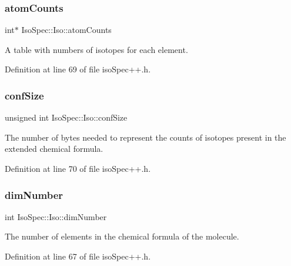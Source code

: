\subsubsection{\texorpdfstring{atom\+Counts}{atomCounts}}
{\footnotesize\ttfamily int$\ast$ Iso\+Spec\+::\+Iso\+::atom\+Counts\hspace{0.3cm}{\ttfamily [protected]}}

A table with numbers of isotopes for each element. 

Definition at line 69 of file iso\+Spec++.\+h.

\mbox{\label{class_iso_spec_1_1_iso_a89ed144bf2495fa25840aca90a31b425}} 
\subsubsection{\texorpdfstring{conf\+Size}{confSize}}
{\footnotesize\ttfamily unsigned int Iso\+Spec\+::\+Iso\+::conf\+Size\hspace{0.3cm}{\ttfamily [protected]}}

The number of bytes needed to represent the counts of isotopes present in the extended chemical formula. 

Definition at line 70 of file iso\+Spec++.\+h.

\mbox{\label{class_iso_spec_1_1_iso_a90245f9bc318f12720c134f61bbe0db0}} 
\subsubsection{\texorpdfstring{dim\+Number}{dimNumber}}
{\footnotesize\ttfamily int Iso\+Spec\+::\+Iso\+::dim\+Number\hspace{0.3cm}{\ttfamily [protected]}}

The number of elements in the chemical formula of the molecule. 

Definition at line 67 of file iso\+Spec++.\+h.

\mbox{\label{class_iso_spec_1_1_iso_ad2a353f2c746648b08a9ad31ff775766}} 
